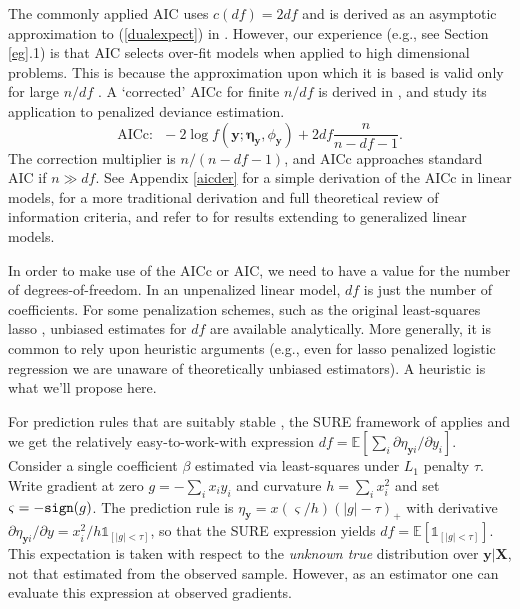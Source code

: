 \documentclass[12pt]{article}
\newcommand{\bs}[1]{\boldsymbol{#1}}
\newcommand{\bm}[1]{\mathbf{#1}}
\newcommand{\ds}[1]{\mathds{#1}}
\begin{document}
The commonly applied AIC uses $c(df)=2df$ and is derived as an asymptotic approximation to (\ref{dualexpect}) in 
\cite{akaike_information_1973}.  However, our experience (e.g., see Section
\ref{eg}.1) is that AIC selects over-fit models when applied to high dimensional
problems.  This is because the approximation upon which it is based
is valid only for large $n/df$ \citep{burnham_model_2002}.  A `corrected' AICc
for finite $n/df$ is derived in
\cite{hurvich_regression_1989}, and \citet{flynn_efficiency_2013} study its
application to penalized deviance estimation.
\begin{equation}
\text{AICc:}~~~-2\log f(\bm{y}; \bs{\eta}_{\bm{y}},\phi_{\bm{y}}) + 2df\frac{n}{n-df-1}.
\end{equation}
The correction multiplier is $n/(n-df-1)$, and AICc approaches standard AIC if
$n\gg df$. See Appendix \ref{aicder} for a simple derivation of the AICc in
linear models, \cite{claeskens_model_2008} for a more traditional derivation
and full theoretical review of information criteria, and refer to
\citet{flynn_efficiency_2013} for results extending to generalized linear
models.

In order to make use of the AICc or AIC, we need to have a value for the
number of degrees-of-freedom. In an unpenalized linear model, $df$ is just the
number of coefficients.   For some penalization schemes, such as the original
least-squares lasso
\citep{zou_degrees_2007}, unbiased estimates for $df$ are available
analytically.   More generally, it is common to rely upon heuristic arguments
(e.g., even for lasso penalized logistic regression we are unaware of
theoretically unbiased estimators).  A heuristic is what we'll propose here.

For prediction rules that are suitably stable \citep[i.e., Lipschitz; see][]{zou_degrees_2007}, the SURE framework of
\cite{stein_estimation_1981} applies and we get the relatively
easy-to-work-with expression  $df =
\ds{E}\left[\sum_i \partial \eta_{\bm{y}i}/\partial y_i\right]$.
Consider  a single coefficient $\beta$ estimated via least-squares under $L_1$
penalty $\tau$.   Write gradient at zero $g = -\sum_i x_iy_i$ and curvature $h
= \sum_i x_i^2$ and set $\varsigma = -{\tt sign}(g)$. The prediction rule is
$\eta_{\bm{y}} = x(\varsigma/h)(|g|-\tau)_+$ with  derivative $\partial \eta_{\bm{y}i}/\partial y = x_i^2/h \ds{1}_{[|g|<\tau]}$, so that the SURE expression
yields $df = \ds{E}\left[ \ds{1}_{[|g|<\tau]} \right]$.   This expectation is
taken with respect to the {\it unknown true} distribution over $\bm{y} |
\bm{X}$, not that estimated from the observed sample.  However, as an estimator
\citep[e.g.,][]{zou_degrees_2007} one can evaluate this expression at observed
gradients.
\end{document}

